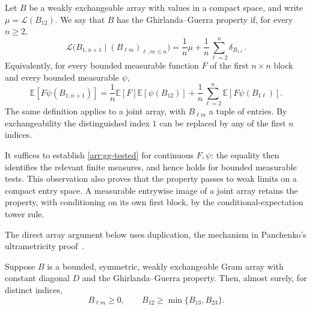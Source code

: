 \begin{definition}
\label{arr:gg}
Let $B$ be a weakly exchangeable array with values in a compact space, and
write $\mu=\mathcal L(B_{12})$.  We say that $B$ has the
Ghirlanda--Guerra property if, for every $n\geq2$,
\begin{equation}
 \mathcal L\bigl(B_{1,n+1}\mid (B_{\ell m})_{\ell,m\leq n}\bigr)
 =\frac1n\mu+\frac1n\sum_{\ell=2}^n\delta_{B_{1\ell}}.
 \label{arr:conditional-gg}
\end{equation}
Equivalently, for every bounded measurable function $F$ of the first
$n\times n$ block and every bounded measurable $\psi$,
\begin{equation}
 \mathbb E[F\psi(B_{1,n+1})]
 =\frac1n\mathbb E[F]\mathbb E[\psi(B_{12})]
  +\frac1n\sum_{\ell=2}^n\mathbb E[F\psi(B_{1\ell})].
 \label{arr:gg-tested}
\end{equation}
The same definition applies to a joint array, with $B_{\ell m}$ a tuple of
entries.  By exchangeability the distinguished index $1$ can be replaced
by any of the first $n$ indices.
\end{definition}

It suffices to establish \eqref{arr:gg-tested} for continuous $F,\psi$:
the equality then identifies the relevant finite measures, and hence holds
for bounded measurable tests.  This observation also proves that the
property passes to weak limits on a compact entry space.  A measurable
entrywise image of a joint array retains the property, with conditioning
on its own first block, by the conditional-expectation tower rule.

The direct array argument below uses duplication, the mechanism in
Panchenko's ultrametricity proof~\cite[Theorem~4 and Section~3]{panchenko2013}.

\begin{theorem}
\label{arr:ultrametric}
Suppose $B$ is a bounded, symmetric, weakly exchangeable Gram array with
constant diagonal $D$ and the Ghirlanda--Guerra property.  Then, almost
surely, for distinct indices,
\begin{equation}
 B_{\ell m}\geq0,
 \qquad
 B_{12}\geq\min\{B_{13},B_{23}\}.
 \label{arr:ultrametric-inequality}
\end{equation}
\end{theorem}

